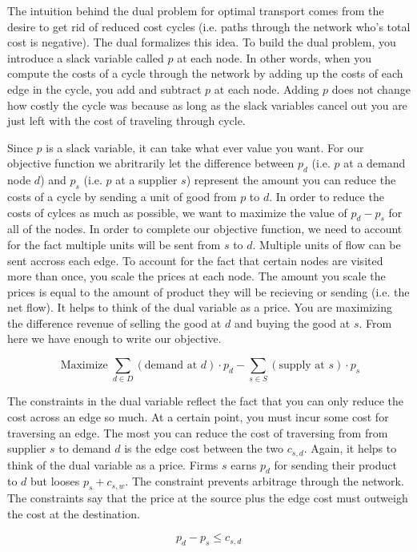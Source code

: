 \documentclass{report}
\begin{document}
The intuition behind the dual problem for optimal transport comes from the desire to get rid of reduced cost cycles (i.e. paths through the network who's total cost is negative). The dual formalizes this idea. To build the dual problem, you introduce a slack variable called $p$ at each node. In other words, when you compute the costs of a cycle through the network by adding up the costs of each edge in the cycle, you add and subtract $p$ at each node. Adding $p$ does not change how costly the cycle was because as long as the slack variables cancel out you are just left with the cost of traveling through cycle.

Since $p$ is a slack variable, it can take what ever value you want. For our objective function we abritrarily let the difference between $p_d$ (i.e. $p$ at a demand node $d$) and $p_s$  (i.e. $p$ at a supplier $s$) represent the amount you can reduce the costs of a cycle by sending a unit of good from $p$ to $d$. In order to reduce the costs of cylces as much as possible, we want to maximize the value of $p_d - p_s$ for all of the nodes.  In order to complete our objective function, we need to account for the fact multiple units will be sent from $s$ to $d$. Multiple units of flow can be sent accross each edge. To account for the fact that certain nodes are visited more than once, you scale the prices at each node. The amount you scale the prices is equal to the amount of product they will be recieving or sending (i.e. the net flow). It helps to think of the dual variable as a price. You are maximizing the difference revenue of selling the good at $d$ and buying the good at $s$. From here we have enough to write our objective.

$$\operatorname{Maximize} \sum_{d \in D}  (\text{demand at } d) \cdot p_{d} -   \sum_{s \in S}  (\text{supply at } s) \cdot p_{s} $$

The constraints in the dual variable reflect the fact that you can only reduce the cost across an edge so much. At a certain point, you must incur some cost for traversing an edge. The most you can reduce the cost of traversing from from supplier $s$ to demand $d$ is the edge cost between the two $c_{s,d}$. Again, it helps to think of the dual variable as a price. Firms $s$ earns $p_d$ for sending their product to $d$ but looses $p_s + c_{s,w}$. The constraint prevents arbitrage through the network.  The constraints say that the price at the source plus the edge cost must outweigh the cost at the destination.

$$ p_d -p_s  \leq c_{s,d}$$
\end{document}
